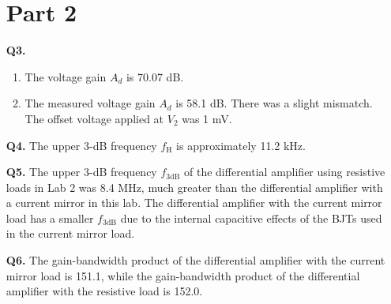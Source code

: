 \documentclass[12pt]{article}
\begin{document}
\begin{itemize}
    \section*{Part 2}
    \item [\textbf{Q3.}]
    \begin{enumerate}
        \item The voltage gain $A_d$ is 70.07 dB.
        \item The measured voltage gain $A_d$ is 58.1 dB. There was a slight mismatch. The offset voltage applied at $V_2$ was 1 mV.
    \end{enumerate}
    \item [\textbf{Q4.}]
    The upper 3-dB frequency $f_{\text{H}}$ is approximately 11.2 kHz.
    \item [\textbf{Q5.}]
    The upper 3-dB frequency $f_{3\text{dB}}$ of the differential amplifier using resistive loads in Lab 2 was 8.4 MHz, much greater than the differential amplifier with a current mirror in this lab. The differential amplifier with the current mirror load has a smaller $f_{3\text{dB}}$ due to the internal capacitive effects of the BJTs used in the current mirror load.
    \item [\textbf{Q6.}]
    The gain-bandwidth product of the differential amplifier with the current mirror load is 151.1, while the gain-bandwidth product of the differential amplifier with the resistive load is 152.0.
\end{itemize}
\newpage
\end{document}
